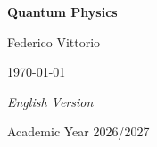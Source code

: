 \documentclass[a4paper, 10 pt]{book}
\begin{document}
\begin{titlepage}
    \centering
    \vspace*{3cm}
    {\Huge\bfseries Quantum Physics\par}
    
    \vspace{1.5cm}
    {\Large Federico Vittorio\par}
    
    \vspace{0.6cm}
    {\large \today\par}
    
    \vfill
    
    {\normalsize\itshape English Version\par}
    \vspace{0.3cm}
    {\large Academic Year 2026/2027\par}
    \vspace*{1cm}
\end{titlepage}
\tableofcontents










\end{document}
